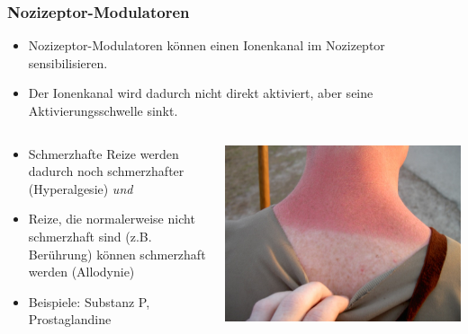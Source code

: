 \documentclass{beamer}
\begin{document}
\begin{frame}
\frametitle{Nozizeptor-Modulatoren}

\begin{itemize}
\item
Nozizeptor-Modulatoren können einen Ionenkanal im Nozizeptor sensibilisieren.
\item
Der Ionenkanal wird dadurch nicht direkt aktiviert, aber seine Aktivierungsschwelle sinkt.
\end{itemize}

\begin{columns}[c]
\begin{column}{6.5cm}

\begin{itemize}
\item
Schmerzhafte Reize werden dadurch noch schmerzhafter (Hyperalgesie) \emph{und}

\item
Reize, die normalerweise nicht schmerzhaft sind (z.B. Berührung) können schmerzhaft werden (Allodynie)
\item
Beispiele: Substanz P, Prostaglandine
\end{itemize}
\end{column}

\begin{column}{5cm}
\begin{center}
\includegraphics[width=\textwidth]{Sunburn.jpg}
\end{center}

\end{column}
\end{columns}

\end{frame}
\end{document}
